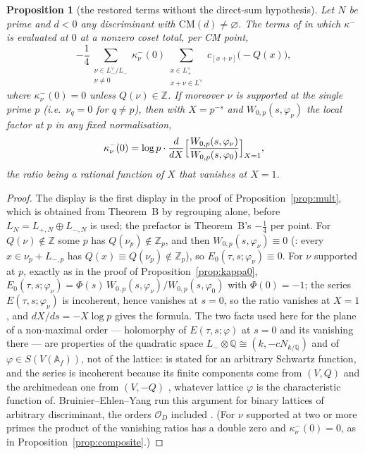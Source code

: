 \documentclass[11pt,reqno]{amsart}
\theoremstyle{plain}
\newtheorem{proposition}[theorem]{Proposition}
\theoremstyle{definition}
\newcommand{\Q}{\mathbb{Q}}
\newcommand{\Z}{\mathbb{Z}}
\newcommand{\Ldual}{L^{\vee}}
\newcommand{\Lm}{L_{-}}
\newcommand{\Lp}{L_{+}}
\begin{document}
\begin{proposition}[the restored terms without the direct-sum hypothesis]\label{prop:fibre}
Let $N$ be prime and $d<0$ any discriminant with $\mathrm{CM}(d)\neq\varnothing$. The terms of
\cite[Thm.~B]{GY} in which $\kappa^-$ is evaluated at $0$ at a nonzero coset total, per CM point,
\[
  -\frac14\sum_{\substack{\nu\in\Lm^\vee/\Lm\\ \nu\neq0}}\kappa^-_\nu(0)
     \sum_{\substack{x\in\Lp^\vee\\ x+\nu\in\Ldual}}c_{[x+\nu]}\bigl(-Q(x)\bigr),
\]
where $\kappa^-_\nu(0)=0$ unless $Q(\nu)\in\Z$. If moreover $\nu$ is supported at the single prime
$p$ (i.e.\ $\nu_q=0$ for $q\neq p$), then with $X=p^{-s}$ and $W_{0,p}(s,\varphi_\nu)$ the local
factor at $p$ in any fixed normalisation,
\[
  \kappa^-_\nu(0)=\log p\cdot\frac{d}{dX}\Bigl[\frac{W_{0,p}(s,\varphi_\nu)}{W_{0,p}(s,\varphi_0)}
  \Bigr]_{X=1},
\]
the ratio being a rational function of $X$ that vanishes at $X=1$.
\end{proposition}
\begin{proof}
The display is the first display in the proof of Proposition~\ref{prop:mult}, which is obtained
from Theorem~B by regrouping alone, before $L_N=L_{+,N}\oplus L_{-,N}$ is used; the prefactor is
Theorem~B's $-\tfrac14$ per point. For $Q(\nu)\notin\Z$ some $p$ has $Q(\nu_p)\notin\Z_p$, and then
$W_{0,p}(s,\varphi_\nu)\equiv0$ (\cite[Thm.~4.3(i), 4.4(i)]{KY}: every $x\in\nu_p+L_{-,p}$ has
$Q(x)\equiv Q(\nu_p)\notin\Z_p$), so $E_0(\tau,s;\varphi_\nu)\equiv0$. For $\nu$ supported at $p$,
exactly as in the proof of Proposition~\ref{prop:kappa0}, $E_0(\tau,s;\varphi_\nu)=\Phi(s)\,
W_{0,p}(s,\varphi_\nu)/W_{0,p}(s,\varphi_0)$ with $\Phi(0)=-1$; the series $E(\tau,s;\varphi_\nu)$ is
incoherent, hence vanishes at $s=0$, so the ratio vanishes at $X=1$, and $dX/ds=-X\log p$ gives the
formula. The two facts used here for the plane of a non-maximal order --- holomorphy of
$E(\tau,s;\varphi)$ at $s=0$ \cite[Cor.~2.5]{KY} and its vanishing there --- are properties of the
quadratic space $\Lm\otimes\Q\cong(k,-cN_{k/\Q})$ and of $\varphi\in S(V(\mathbb A_f))$, not of the
lattice: \cite[Cor.~2.5]{KY} is stated for an arbitrary Schwartz function, and the series is
incoherent because its finite components come from $(V,Q)$ and the archimedean one from $(V,-Q)$
\cite[after (2.18)]{BY}, whatever lattice $\varphi$ is the characteristic function of.
Bruinier--Ehlen--Yang run this argument for binary lattices of arbitrary discriminant, the orders
$\mathcal O_D$ included \cite[\S3]{BEY}. (For $\nu$ supported at two or more primes the product of the vanishing ratios has a
double zero and $\kappa^-_\nu(0)=0$, as in Proposition~\ref{prop:composite}.)
\end{proof}
\end{document}
